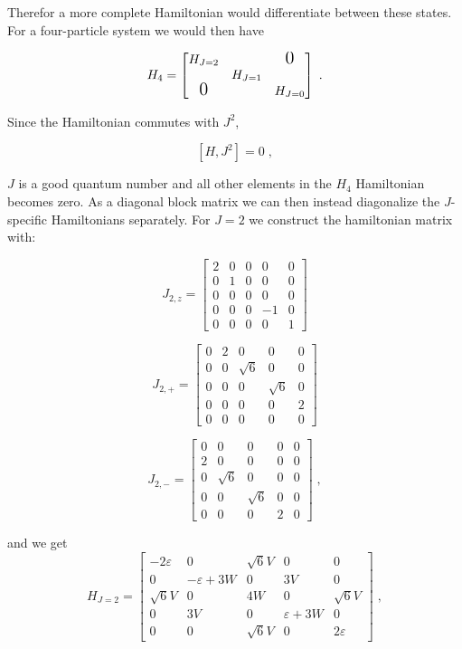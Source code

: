 Therefor a more complete Hamiltonian would differentiate between these states. For a four-particle system we would then have 

\begin{equation}
    H_{4} = \begin{bmatrix}
        H_{J=2} &  & \text{\Large0}\\
         & H_{J=1} & \\
        \text{\Large0} & & H_{J=0}
    \end{bmatrix} \; . 
\end{equation}

Since the Hamiltonian commutes with $J^2$,

\begin{equation}
    \left [ H, J^2\right ] = 0 \;,
\end{equation}

$J$ is a good quantum number and all other elements in the $H_4$ Hamiltonian becomes zero. As a diagonal block matrix we can then instead diagonalize the $J$-specific Hamiltonians separately. For $J=2$ we construct the hamiltonian matrix with:

$$J_{2, z} = \begin{bmatrix} 
  2 & 0 & 0 & 0 & 0 \\
  0 & 1 & 0 & 0 & 0 \\
  0 & 0 & 0 & 0 & 0 \\
  0 & 0 & 0 & -1 & 0 \\
  0 & 0 & 0 & 0 & 1 \end{bmatrix}$$

$$J_{2, +} = \begin{bmatrix} 
  0 & 2 & 0 & 0 & 0 \\
  0 & 0 & \sqrt{6} & 0 & 0 \\
  0 & 0 & 0 & \sqrt{6} & 0 \\
  0 & 0 & 0 & 0 & 2 \\
  0 & 0 & 0 & 0 & 0 \end{bmatrix}$$

$$J_{2, -} = \begin{bmatrix} 
  0 & 0& 0 & 0 & 0 \\
  2  & 0 & 0 & 0 & 0 \\
  0 &\sqrt{6} & 0 & 0 & 0 \\
  0 & 0 & \sqrt{6}& 0 & 0\\
  0 & 0 & 0 & 2 & 0 \end{bmatrix} \; ,$$

and we get
\begin{equation}
H_{J = 2} =
\begin{bmatrix}
-2\varepsilon & 0 & \sqrt{6}V & 0 & 0 \\
0 & -\varepsilon + 3W & 0 & 3V & 0 \\
\sqrt{6}V & 0 & 4W & 0 & \sqrt{6}V \\
0 & 3V & 0 & \varepsilon + 3W & 0 \\
0 & 0 & \sqrt{6}V & 0 & 2\varepsilon
\end{bmatrix}
\label{eq:HJ=2} \; ,
\end{equation}

